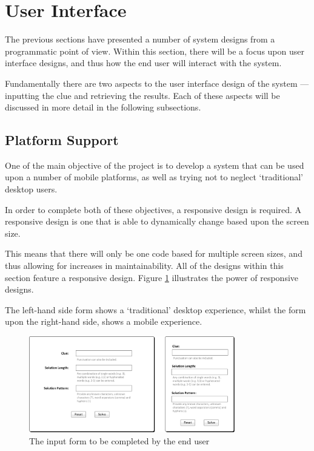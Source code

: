 \section{User Interface}
\label{sec:user_interface}

The previous sections have presented a number of system designs from a 
programmatic point of view. Within this section, there will be a focus upon 
user interface designs, and thus how the end user will interact with the system.

Fundamentally there are two aspects to the user interface design of the system 
--- inputting the clue and retrieving the results. Each of these aspects will 
be discussed in more detail in the following subsections.


\subsection{Platform Support} 
\label{sub:platform_support}

One of the main objective of the project is to develop a system that can be used
upon a number of mobile platforms, as well as trying not to neglect 
`traditional' desktop users.

In order to complete both of these objectives, a responsive design is required.
A responsive design is one that is able to dynamically change based upon the 
screen size.

This means that there will only be one code based for multiple screen sizes, and
thus allowing for increases in maintainability. All of the designs within this
section feature a responsive design. Figure \ref{fig:input_form_compare} 
illustrates the power of responsive designs.

The left-hand side form shows a `traditional' desktop experience, whilst the 
form upon the right-hand side, shows a mobile experience.

\begin{figure}[H]
  \centering
  \includegraphics[width=0.8\textwidth]{design/ui/form_comparison.jpg}
  \caption{The input form to be completed by the end user}
  \label{fig:input_form_compare}
\end{figure}


